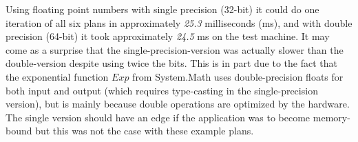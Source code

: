 Using floating point numbers with single precision (32-bit) it could do one iteration of all six plans in approximately \emph{25.3} milliseconds (ms), and with double precision (64-bit) it took approximately \emph{24.5} ms on the test machine.
It may come as a surprise that the single-precision-version was actually slower than the double-version despite using twice the bits.
This is in part due to the fact that the exponential function $Exp$ from System.Math uses double-precision floats for both input and output (which requires type-casting in the single-precision version), but is mainly because double operations are optimized by the hardware\cite{northrup2008mcts}.
The single version should have an edge if the application was to become memory-bound but this was not the case with these example plans.